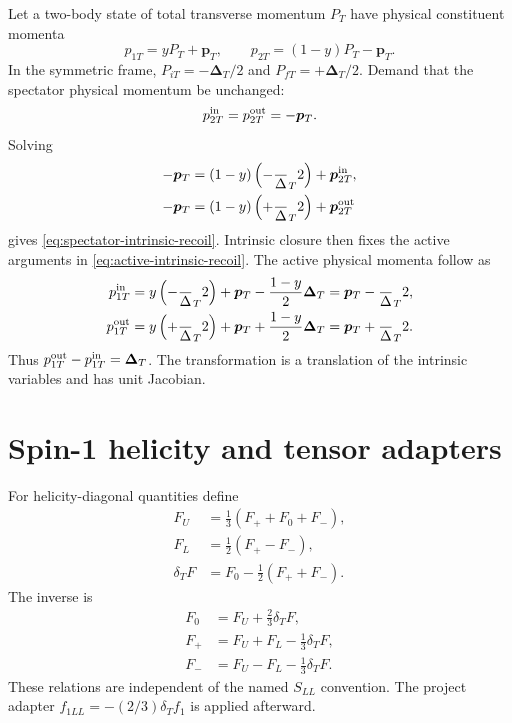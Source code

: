 \documentclass[11pt]{article}
\newcommand{\pT}{\bm{p}_{T}}
\newcommand{\DT}{\bm{\Delta}_{T}}
\begin{document}
Let a two-body state of total transverse momentum \(P_T\) have physical
constituent momenta
\begin{equation}
 p_{1T}=yP_T+\pT,
 \qquad
 p_{2T}=(1-y)P_T-\pT.
\label{eq:two-body-physical-momenta}
\end{equation}
In the symmetric frame,
\(
 P_{iT}=-\DT/2
\) and
\(
 P_{fT}=+\DT/2
\).
Demand that the spectator physical momentum be unchanged:
\begin{equation}
 p_{2T}^{\rm in}=p_{2T}^{\rm out}=-\pT.
\label{eq:spectator-fixed-condition}
\end{equation}
Solving
\begin{align}
 -\pT&=(1-y)\left(-\frac\DT2\right)+\bm p_{2T}^{\rm in},
\notag\\
 -\pT&=(1-y)\left(+\frac\DT2\right)+\bm p_{2T}^{\rm out}
\end{align}
gives \cref{eq:spectator-intrinsic-recoil}.  Intrinsic closure then fixes the
active arguments in \cref{eq:active-intrinsic-recoil}.  The active physical
momenta follow as
\begin{align}
 p_{1T}^{\rm in}
 &=y\left(-\frac\DT2\right)
 +\pT-\frac{1-y}{2}\DT
 =\pT-\frac\DT2,
\notag\\
 p_{1T}^{\rm out}
 &=y\left(+\frac\DT2\right)
 +\pT+\frac{1-y}{2}\DT
 =\pT+\frac\DT2.
\end{align}
Thus \(p_{1T}^{\rm out}-p_{1T}^{\rm in}=\DT\).  The transformation is a
translation of the intrinsic variables and has unit Jacobian.

\section{Spin-1 helicity and tensor adapters}
\label{app:spin-adapters}

For helicity-diagonal quantities define
\begin{align}
 F_U&=\frac13(F_++F_0+F_-),
\label{eq:FU-adapter}\\
 F_L&=\frac12(F_+-F_-),
\label{eq:FL-adapter}\\
 \delta_TF&=F_0-\frac12(F_++F_-).
\label{eq:deltaT-adapter}
\end{align}
The inverse is
\begin{align}
 F_0&=F_U+\frac23\delta_TF,
\label{eq:F0-inverse}\\
 F_+&=F_U+F_L-\frac13\delta_TF,
\label{eq:Fplus-inverse}\\
 F_-&=F_U-F_L-\frac13\delta_TF.
\label{eq:Fminus-inverse}
\end{align}
These relations are independent of the named \(S_{LL}\) convention.  The
project adapter \(f_{1LL}=-(2/3)\delta_Tf_1\) is applied afterward.
\end{document}

